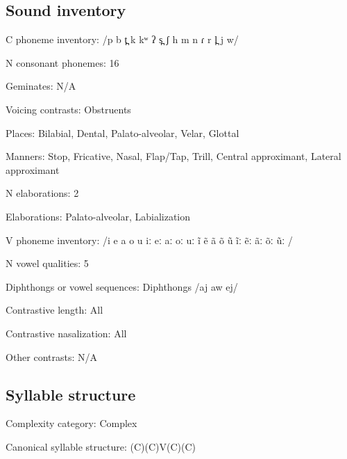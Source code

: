 {\subsection*{Sound inventory}
\begin{appendixdesc}

\item[C phoneme inventory:] /p b t̪ k kʷ ʔ s̪ ʃ h m n ɾ r l̪ j w/

\item[N consonant phonemes:] 16

\item[Geminates:] N/A

\item[Voicing contrasts:] Obstruents

\item[Places:] Bilabial, Dental, Palato-alveolar, Velar, Glottal

\item[Manners:] Stop, Fricative, Nasal, Flap/Tap, Trill, Central approximant, Lateral approximant

\item[N elaborations:] 2

\item[Elaborations:] Palato-alveolar, Labialization

\item[V phoneme inventory:] /i e a o u iː eː aː oː uː ĩ ẽ ã õ ũ ĩː ẽː ãː õː ũː /

\item[N vowel qualities:] 5

\item[Diphthongs or vowel sequences:] Diphthongs /aj aw ej/

\item[Contrastive length:] All

\item[Contrastive nasalization:] All

\item[Other contrasts:] N/A
\end{appendixdesc}
\subsection*{Syllable structure}
\begin{appendixdesc}

\item[Complexity category:] Complex

\item[Canonical syllable structure:] (C)(C)V(C)(C) \citep[20--21]{Holt1999}


\end{appendixdesc}}
